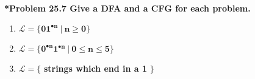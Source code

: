 \documentclass{article}
\begin{document}
    \noindent\\[0.25in]
    \noindent\textbf{*Problem 25.7 Give a DFA and a CFG for each problem.}
    \begin{enumerate}[label=(\alph*)]
        \item $\mathbf{\mathcal{L}=\{01^{\bullet n}\ |\ n\ge 0\}}$
        \item $\mathbf{\mathcal{L}=\{0^{\bullet n}1^{\bullet n}\ |\ 0\le n\le 5\}}$
        \item $\mathbf{\mathcal{L}=\{}$ \textbf{strings which end in a 1} $\mathbf{\}}$
    \end{enumerate}
\end{document}
